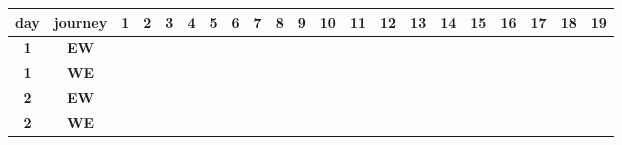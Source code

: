 \documentclass[11pt,letter]{article}
\begin{document}
\begin{table}[h]
\centering

\begin{tabular}{|c|c|*{19}{l|}}
\hline
\multicolumn{1}{|l|}{\textbf{day}} & \textbf{journey}   & 1                        & 2                        & 3                        & 4                        & 5                        & 6                        & 7                        & 8                        & 9                        & 10                       & 11                       & 12                       & 13                       & 14                       & 15                       & 16                       & 17                       & 18                       & 19                       \\ \hline
\textbf{1} & \textbf{EW} & \cellcolor[HTML]{F56B00} & \cellcolor[HTML]{F56B00} & \cellcolor[HTML]{5AB25A} & \cellcolor[HTML]{FFCB2F} & \cellcolor[HTML]{FFCB2F} & \cellcolor[HTML]{F56B00} & \cellcolor[HTML]{FFCB2F} & \cellcolor[HTML]{5AB25A} & \cellcolor[HTML]{F56B00} & \cellcolor[HTML]{5AB25A} & \cellcolor[HTML]{FFCB2F} & \cellcolor[HTML]{F56B00} & \cellcolor[HTML]{FFCB2F} & \cellcolor[HTML]{FFCB2F} & \cellcolor[HTML]{F56B00} & \cellcolor[HTML]{9A0000} & \cellcolor[HTML]{FFCB2F} & \cellcolor[HTML]{F56B00} & \cellcolor[HTML]{5AB25A} \\
\hline
\textbf{1} & \textbf{WE} & \cellcolor[HTML]{F56B00} & \cellcolor[HTML]{F56B00} &                          & \cellcolor[HTML]{FFCB2F} & \cellcolor[HTML]{FFCB2F} & \cellcolor[HTML]{FFCB2F} & \cellcolor[HTML]{FFCB2F} & \cellcolor[HTML]{FFCB2F} & \cellcolor[HTML]{F56B00} & \cellcolor[HTML]{F56B00} & \cellcolor[HTML]{FFCB2F} & \cellcolor[HTML]{F56B00} & \cellcolor[HTML]{FFCB2F} & \cellcolor[HTML]{FFCB2F} & \cellcolor[HTML]{9A0000} & \cellcolor[HTML]{9A0000} & \cellcolor[HTML]{FFCB2F} & \cellcolor[HTML]{F56B00} &  \\
 \hline
\textbf{2} & \textbf{EW} & \cellcolor[HTML]{F56B00} & \cellcolor[HTML]{F56B00} & \cellcolor[HTML]{5AB25A} & \cellcolor[HTML]{FFCB2F} & \cellcolor[HTML]{FFCB2F} & \cellcolor[HTML]{FFCB2F} & \cellcolor[HTML]{FFCB2F} & \cellcolor[HTML]{FFCB2F} & \cellcolor[HTML]{F56B00} & \cellcolor[HTML]{F56B00} & \cellcolor[HTML]{FFCB2F} & \cellcolor[HTML]{F56B00} & \cellcolor[HTML]{FFCB2F} & \cellcolor[HTML]{F56B00} & \cellcolor[HTML]{9A0000} & \cellcolor[HTML]{9A0000} & \cellcolor[HTML]{FFCB2F} & \cellcolor[HTML]{F56B00} & \cellcolor[HTML]{5AB25A} \\
\hline
\textbf{2} & \textbf{WE} & \cellcolor[HTML]{F56B00} & \cellcolor[HTML]{F56B00} & \cellcolor[HTML]{5AB25A} & \cellcolor[HTML]{FFCB2F} & \cellcolor[HTML]{FFCB2F} & \cellcolor[HTML]{FFCB2F} & \cellcolor[HTML]{FFCB2F} & \cellcolor[HTML]{FFCB2F} & \cellcolor[HTML]{F56B00} & \cellcolor[HTML]{FFCB2F} & \cellcolor[HTML]{FFCB2F} & \cellcolor[HTML]{FFCB2F} & \cellcolor[HTML]{FFCB2F} & \cellcolor[HTML]{FFCB2F} & \cellcolor[HTML]{9A0000} & \cellcolor[HTML]{9A0000} & \cellcolor[HTML]{FFCB2F} & \cellcolor[HTML]{9A0000} & \cellcolor[HTML]{5AB25A} \\ \hline
\end{tabular}
%
\vspace{0.5cm}


\end{table}
\end{document}

